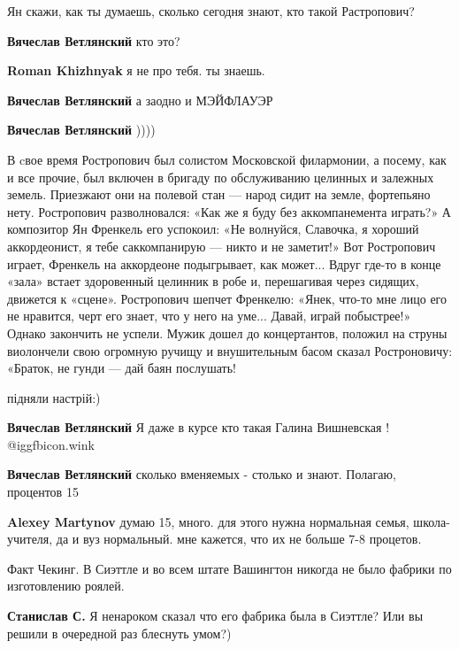 \begin{itemize}
Ян скажи, как ты думаешь, сколько сегодня знают, кто такой Растропович?

\begin{itemize} %
\textbf{Вячеслав Ветлянский} кто это?

\textbf{Roman Khizhnyak} я не про тебя. ты знаешь.

\textbf{Вячеслав Ветлянский} а заодно и МЭЙФЛАУЭР

\textbf{Вячеслав Ветлянский} ))))


В cвое время Ростропович был солистом Московской филармонии, а посему, как и
все прочие, был включен в бригаду по обслуживанию целинных и залежных земель.
Приезжают они на полевой стан — народ сидит на земле, фортепьяно нету.
Ростропович разволновался: «Как же я буду без аккомпанемента играть?» А
композитор Ян Френкель его успокоил: «Не волнуйся, Славочка, я хороший
аккордеонист, я тебе саккомпанирую — никто и не заметит!» Вот Ростропович
играет, Френкель на аккордеоне подыгрывает, как может... Вдруг где-то в конце
«зала» встает здоровенный целинник в робе и, перешагивая через сидящих,
движется к «сцене». Ростропович шепчет Френкелю: «Янек, что-то мне лицо его не
нравится, черт его знает, что у него на уме... Давай, играй побыстрее!» Однако
закончить не успели. Мужик дошел до концертантов, положил на струны виолончели
свою огромную ручищу и внушительным басом сказал Ростроновичу: «Браток, не
гунди — дай баян послушать!

підняли настрій:)

\textbf{Вячеслав Ветлянский} Я даже в курсе кто такая Галина Вишневская ! @igg{fbicon.wink} 

\textbf{Вячеслав Ветлянский} сколько вменяемых - столько и знают. Полагаю, процентов 15

\textbf{Alexey Martynov} думаю 15, много. для этого нужна нормальная семья, школа-учителя, да и вуз нормальный. мне кажется, что их не больше 7-8 процетов.
\end{itemize} %


Факт Чекинг. В Сиэттле и во всем штате Вашингтон никогда не было фабрики по
изготовлению роялей.

\begin{itemize} %
\textbf{Станислав С.} Я ненароком сказал что его фабрика была в Сиэттле? Или вы решили в очередной раз блеснуть умом?)


\end{itemize}
\end{itemize}

